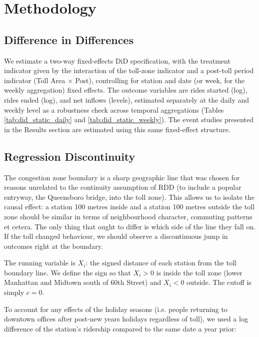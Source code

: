 \documentclass[10pt]{article}
\begin{document}
\section{Methodology}

\subsection{Difference in Differences}

We estimate a two-way fixed-effects DiD specification, with the treatment indicator given by the interaction of the toll-zone indicator and a post-toll period indicator (Toll Area $\times$ Post), controlling for station and date (or week, for the weekly aggregation) fixed effects. The outcome variables are rides started (log), rides ended (log), and net inflows (levels), estimated separately at the daily and weekly level as a robustness check across temporal aggregations (Tables \ref{tab:did_static_daily} and \ref{tab:did_static_weekly}). The event studies presented in the Results section are estimated using this same fixed-effect structure.

\subsection{Regression Discontinuity}

The congestion zone boundary is a sharp geographic line that was chosen for reasons unrelated to the continuity assumption of RDD (to include a popular entryway, the Queensboro bridge, into the toll zone). This allows us to isolate the causal effect: a station 100 metres inside and a station 100 metres outside the toll zone should be similar in terms of neighbourhood character, commuting patterns et cetera. The only thing that ought to differ is which side of the line they fall on. If the toll changed behaviour, we should observe a discontinuous jump in outcomes right at the boundary.

The running variable is $X_i$: the signed distance of each station from the toll boundary line. We define the sign so that $X_i > 0$ is inside the toll zone (lower Manhattan and Midtown south of 60th Street) and $X_i < 0$ outside. The cutoff is simply $c = 0$.

To account for any effects of the holiday seasons (i.e. people returning to downtown offices after post-new years holidays regardless of toll), we used a log difference of the station's ridership compared to the same date a year prior:
\end{document}
